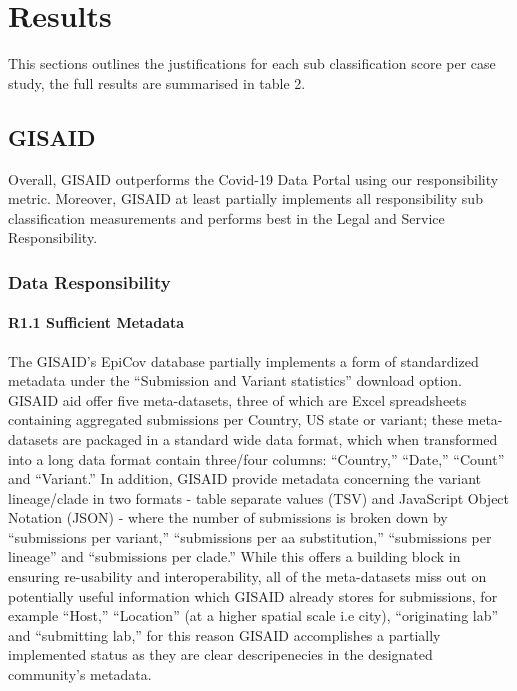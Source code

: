 \documentclass{article}
\begin{document}
\newpage

\hypertarget{results}{%
\section{Results}\label{results}}

This sections outlines the justifications for each sub classification
score per case study, the full results are summarised in table 2.

\hypertarget{gisaid}{%
\subsection{GISAID}\label{gisaid}}

Overall, GISAID outperforms the Covid-19 Data Portal using our
responsibility metric. Moreover, GISAID at least partially implements
all responsibility sub classification measurements and performs best in
the Legal and Service Responsibility.

\hypertarget{data-responsibility-1}{%
\subsubsection{Data Responsibility}\label{data-responsibility-1}}

\hypertarget{r1.1-sufficient-metadata}{%
\paragraph{R1.1 Sufficient Metadata}\label{r1.1-sufficient-metadata}}

The GISAID's EpiCov database partially implements a form of standardized
metadata under the ``Submission and Variant statistics'' download
option. GISAID aid offer five meta-datasets, three of which are Excel
spreadsheets containing aggregated submissions per Country, US state or
variant; these meta-datasets are packaged in a standard wide data
format, which when transformed into a long data format contain
three/four columns: ``Country,'' ``Date,'' ``Count'' and ``Variant.'' In
addition, GISAID provide metadata concerning the variant lineage/clade
in two formats - table separate values (TSV) and JavaScript Object
Notation (JSON) - where the number of submissions is broken down by
``submissions per variant,'' ``submissions per aa substitution,''
``submissions per lineage'' and ``submissions per clade.'' While this
offers a building block in ensuring re-usability and interoperability,
all of the meta-datasets miss out on potentially useful information
which GISAID already stores for submissions, for example ``Host,''
``Location'' (at a higher spatial scale i.e city), ``originating lab''
and ``submitting lab,'' for this reason GISAID accomplishes a partially
implemented status as they are clear descripenecies in the designated
community's metadata.
\end{document}
